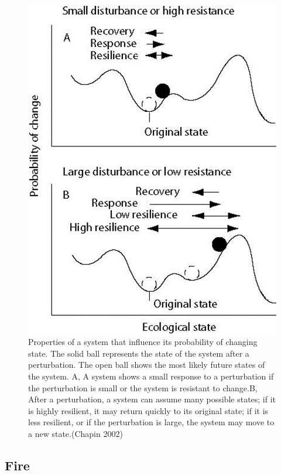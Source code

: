 \documentclass[12pt,oneside]{book}
\begin{document}
\begin{figure}

{\centering \includegraphics[width=0.8\linewidth]{figures/chap8/f84_disturbance2_chapin} 

}

\caption{Properties of a system that influence its probability of changing state. The solid ball represents the state of the system after a perturbation. The open ball shows the most likely future states of the system. A, A system shows a small response to a perturbation if the perturbation is small or the system is resistant to change.B, After a perturbation, a system can assume many possible states; if it is highly resilient, it may return quickly to its original state; if it is less resilient, or if the perturbation is large, the system may move to a new state.(Chapin 2002)}\label{fig:f84}
\end{figure}

\subsection{Fire}\label{fire}
\end{document}
